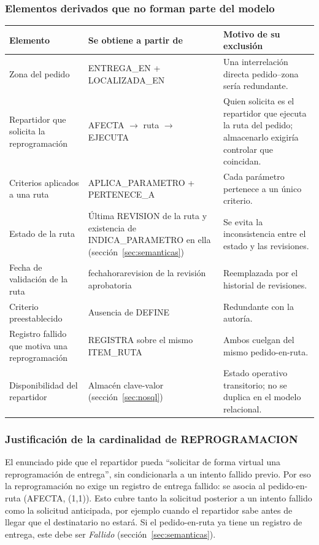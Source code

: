 \documentclass[11pt,a4paper]{article}
\newcommand{\ubrk}{\textunderscore\allowbreak}
\newcommand{\campo}[1]{\textnormal{\ttfamily\let\_\ubrk #1}}
\begin{document}
\subsubsection*{Elementos derivados que no forman parte del modelo}
\begin{longtable}{P{0.28\textwidth}P{0.32\textwidth}P{0.32\textwidth}}
\toprule
\textbf{Elemento} & \textbf{Se obtiene a partir de} & \textbf{Motivo de su exclusión}\\ \midrule
\endhead
Zona del pedido & ENTREGA\_EN + LOCALIZADA\_EN & Una interrelación directa pedido--zona sería redundante.\\
Repartidor que solicita la reprogramación & AFECTA $\rightarrow$ ruta $\rightarrow$ EJECUTA & Quien solicita es el repartidor que ejecuta la ruta del pedido; almacenarlo exigiría controlar que coincidan.\\
Criterios aplicados a una ruta & APLICA\_PARAMETRO + PERTENECE\_A & Cada parámetro pertenece a un único criterio.\\
Estado de la ruta & Última REVISION de la ruta y existencia de INDICA\_PARAMETRO en ella (sección~\ref{sec:semanticas}) & Se evita la inconsistencia entre el estado y las revisiones.\\
Fecha de validación de la ruta & \campo{fecha\_hora\_revision} de la revisión aprobatoria & Reemplazada por el historial de revisiones.\\
Criterio preestablecido & Ausencia de DEFINE & Redundante con la autoría.\\
Registro fallido que motiva una reprogramación & REGISTRA sobre el mismo ITEM\_RUTA & Ambos cuelgan del mismo pedido-en-ruta.\\
Disponibilidad del repartidor & Almacén clave-valor (sección~\ref{sec:nosql}) & Estado operativo transitorio; no se duplica en el modelo relacional.\\
\bottomrule
\end{longtable}

\subsubsection*{Justificación de la cardinalidad de REPROGRAMACION}
El enunciado pide que el repartidor pueda ``solicitar de forma virtual una reprogramación de entrega'', sin condicionarla a un intento fallido previo. Por eso la reprogramación no exige un registro de entrega fallido: se asocia al pedido-en-ruta (AFECTA, (1,1)). Esto cubre tanto la solicitud posterior a un intento fallido como la solicitud anticipada, por ejemplo cuando el repartidor sabe antes de llegar que el destinatario no estará. Si el pedido-en-ruta ya tiene un registro de entrega, este debe ser \textit{Fallido} (sección~\ref{sec:semanticas}).
\end{document}

